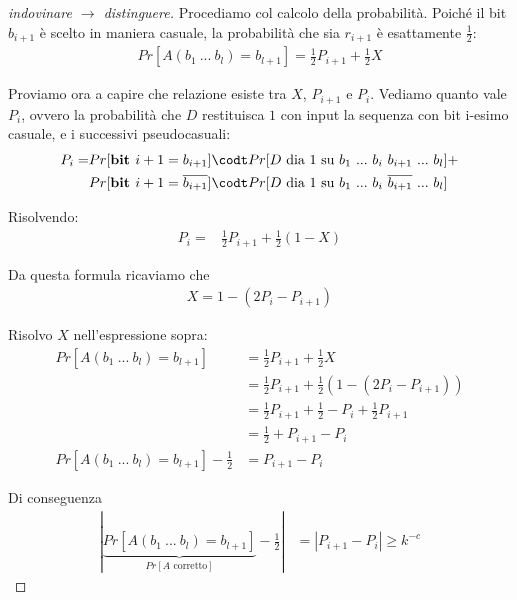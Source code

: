 \begin{proof}[indovinare $\rightarrow$ distinguere]
    Procediamo col calcolo della probabilità. Poiché il bit $b_{i+1}$ è scelto in maniera casuale, la probabilità che sia $r_{i+1}$ è esattamente $\frac{1}{2}$:
    \begin{align*}
        Pr[A(b_1 \ ... \ b_{l}) = b_{l+1}] = \frac{1}{2} P_{i+1} + \frac{1}{2} X
    \end{align*}

    \noindent Proviamo ora a capire che relazione esiste tra $X$, $P_{i+1}$ e $P_i$. Vediamo quanto vale $P_i$, ovvero la probabilità che $D$ restituisca $1$ con input la sequenza con bit i-esimo casuale, e i successivi pseudocasuali:
    \begin{align*}
        P_{i} = &Pr[\textbf{bit $i+1$} = b_{i+1}] \codt Pr[D\text{ dia $1$ su } b_1 \ ... \ b_i \ b_{i+1} \ ... \ b_l] + \\
        &Pr[\textbf{bit $i+1$} = \overline{b_{i+1}}] \codt Pr[D\text{ dia $1$ su } b_1 \ ... \ b_i \ \overline{ b_{i+1}} \ ... \ b_l]
    \end{align*} 

    \noindent Risolvendo:
    \begin{align*}
        P_{i} = &\frac{1}{2}P_{i+1} + \frac{1}{2} (1-X)
    \end{align*}

    \noindent Da questa formula ricaviamo che
    \begin{align*}
        X = 1 - (2P_i - P_{i+1})
    \end{align*}

    \noindent Risolvo $X$ nell'espressione sopra:
    \begin{align*}
        Pr[A(b_1 \ ... \ b_{l}) = b_{l+1}] &= \frac{1}{2} P_{i+1} + \frac{1}{2} X\\
        &= \frac{1}{2} P_{i+1} + \frac{1}{2} (1 - (2P_i - P_{i+1}))\\
        &= \frac{1}{2} P_{i+1} + \frac{1}{2} - P_i + \frac{1}{2} P_{i+1}\\
        &= \frac{1}{2} + P_{i+1} - P_i\\
        Pr[A(b_1 \ ... \ b_{l}) = b_{l+1}] - \frac{1}{2} &= P_{i+1} - P_i
    \end{align*}

    \noindent Di conseguenza
    \begin{align*}
        \left|\underbrace{Pr[A(b_1 \ ... \ b_{l}) = b_{l+1}]}_{Pr[A \text{ corretto}]} - \frac{1}{2} \right| &= \left|P_{i+1} - P_i \right| \ge k^{-c}
    \end{align*}

\end{proof}

